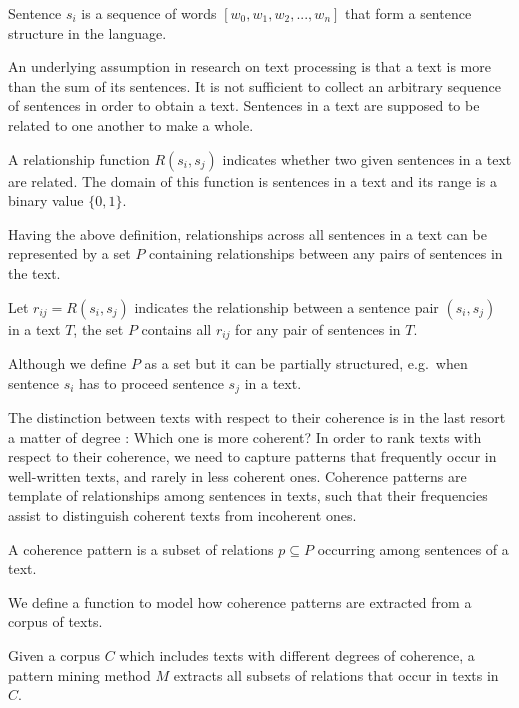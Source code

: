 \begin{definition}
Sentence $s_i$ is a sequence of words $[w_0, w_1, w_2, ... , w_n]$ that form a sentence structure in the language. 
\end{definition}

An underlying assumption in research on text processing is that a text is more than the sum of its sentences. 
It is not sufficient to collect an arbitrary sequence of sentences in order to obtain a text. 
Sentences in a text are supposed to be related to one another to make a whole. 

\begin{definition}
A relationship function $R(s_i,s_j)$ indicates whether two given sentences in a text are related. 
The domain of this function is sentences in a text and its range is a binary value $
\lbrace 0,1\rbrace$. 
\end{definition} 

Having the above definition, relationships across all sentences in a text can be represented by a set $P$ containing relationships between any pairs of sentences in the text. 

\begin{definition}
Let $r_{ij}= R(s_i,s_j)$ indicates the relationship between a sentence pair $(s_i,s_j)$ in a text $T$, the set $P$ contains all $r_{ij}$ for any pair of sentences in $T$.
\end{definition}  

Although we define $P$ as a set but it can be partially structured, e.g.\ when sentence $s_i$ has to proceed sentence $s_j$ in a text. 


The distinction between texts with respect to their coherence is in the last resort a matter of degree \cite{haliday76}: Which one is more coherent? 
In order to rank texts with respect to their coherence, we need to capture patterns that frequently occur in well-written texts, and rarely in less coherent ones.  
Coherence patterns are template of relationships among sentences in texts, such that their frequencies assist to distinguish coherent texts from incoherent ones. 

\begin{definition}
A coherence pattern is a subset of relations $p \subseteq P$ occurring among sentences of a text.   
\end{definition}

We define a function to model how coherence patterns are extracted from a corpus of texts. 

\begin{definition}
Given a corpus $C$ which includes texts with different degrees of coherence, a pattern mining method $M$ extracts all subsets of relations that occur in texts in $C$. 
\end{definition} 


